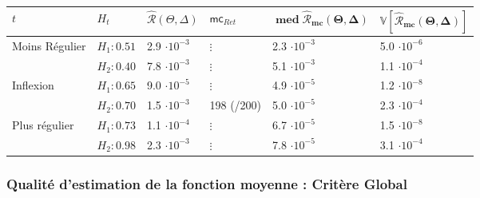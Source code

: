 \begin{table}[H]
	\centering
	\begin{tabularx}{\linewidth}{|X|X|XX|X|X|}
		\toprule
		$t$                                  & $H_t$        & $\widehat{\mathcal R}(\Theta, \Delta)$ & $\textsf{mc}_{Ret}$ & $\mathbf{\operatorname{med}\widehat{\mathcal R}_{mc}(\Theta, \Delta)}$ & $\mathbf{\mathds V[\widehat{\mathcal R}_{mc}(\Theta, \Delta)]}$ \\
		\midrule
		\multirow{2}{\hsize}{Moins Régulier} & $H_1 : 0.51$ & 2.9 $\cdot 10^{-3}$                    & $\vdots$            & 2.3 $\cdot 10^{-3}$                                                      & 5.0 $\cdot 10^{-6}$
		\\
		                                     & $H_2 : 0.40$ & 7.8 $\cdot 10^{-3}$                    & $\vdots$            & 5.1 $\cdot 10^{-3}$                                                      & 1.1 $\cdot 10^{-4}$
		\\
		\midrule
		\multirow{2}{\hsize}{Inflexion}      & $H_1 : 0.65$ & 9.0 $\cdot 10^{-5}$                    & $\vdots$            & 4.9 $\cdot 10^{-5}$                                                      & 1.2 $\cdot 10^{-8}$
		\\
		                                     & $H_2 : 0.70$ & 1.5 $\cdot 10^{-3}$                    & 198 (/200)          & 5.0 $\cdot 10^{-5}$                                                      & 2.3 $\cdot 10^{-4}$
		\\
		\midrule
		\multirow{2}{\hsize}{Plus régulier}  & $H_1 : 0.73$ & 1.1 $\cdot 10^{-4}$                    & $\vdots$            & 6.7 $\cdot 10^{-5}$                                                      & 1.5 $\cdot 10^{-8}$
		\\
		                                     & $H_2 : 0.98$ & 2.3 $\cdot 10^{-3}$                    & $\vdots$            & 7.8 $\cdot 10^{-5}$                                                      & 3.1 $\cdot 10^{-4}$
		\\
		\bottomrule
	\end{tabularx}
\end{table}



\subsubsection{Qualité d'estimation de la fonction moyenne : Critère Global}

